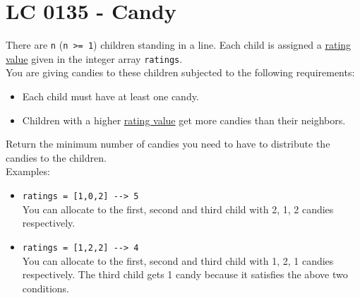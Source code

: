 \section{LC 0135 - Candy}
There are {\colorbox{CodeBackground}{\lstinline|n|}} ({\colorbox{CodeBackground}{\lstinline|n >= 1|}}) children standing in a line. Each child is assigned a \ul{rating value} given in the integer array {\colorbox{CodeBackground}{\lstinline|ratings|}}.\\

You are giving candies to these children subjected to the following requirements:
\begin{itemize}
	\item Each child must have at least one candy.
	\item Children with a higher \ul{rating value} get more candies than their neighbors.
\end{itemize}

Return the minimum number of candies you need to have to distribute the candies to the children.\\

Examples:
\begin{itemize}
\item {\colorbox{CodeBackground}{\lstinline|ratings = [1,0,2] --> 5|}}\\
You can allocate to the first, second and third child with 2, 1, 2 candies respectively.
\item {\colorbox{CodeBackground}{\lstinline|ratings = [1,2,2] --> 4|}}\\
You can allocate to the first, second and third child with 1, 2, 1 candies respectively. The third child gets 1 candy because it satisfies the above two conditions.
\end{itemize}

